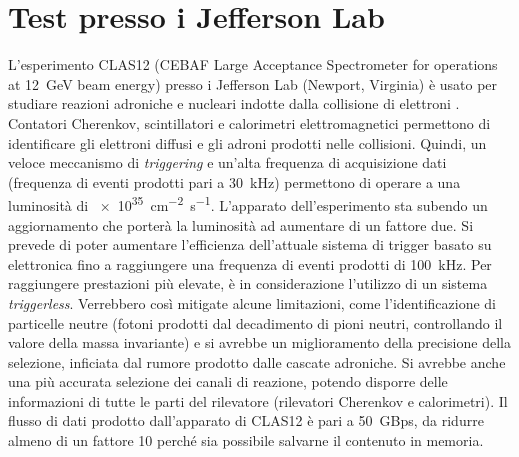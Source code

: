 \documentclass[../main.tex]{subfiles}
\begin{document}
\section{Test presso i Jefferson Lab}
\label{sct:jlab}
L'esperimento CLAS12 (CEBAF Large Acceptance Spectrometer for operations at \SI{12}{\GeV} beam energy) presso i Jefferson Lab (Newport, Virginia) è usato per studiare reazioni adroniche e nucleari indotte dalla collisione di elettroni \cite{3x3telescope}. Contatori Cherenkov, scintillatori e calorimetri elettromagnetici permettono di identificare gli elettroni diffusi e gli adroni prodotti nelle collisioni. Quindi, un veloce meccanismo di \emph{triggering} e un'alta frequenza di acquisizione dati (frequenza di eventi prodotti pari a \SI{30}{\kilo\hertz}) permettono di operare a una luminosità di \SI{e35}{\cm^{-2}\s^{-1}}.
L'apparato dell'esperimento sta subendo un aggiornamento che porterà la luminosità ad aumentare di un fattore due. Si prevede di poter aumentare l'efficienza dell'attuale sistema di trigger basato su elettronica fino a raggiungere una frequenza di eventi prodotti di \SI{100}{\kilo\hertz}. Per raggiungere prestazioni più elevate, è in considerazione l'utilizzo di un sistema \emph{triggerless}. Verrebbero così mitigate alcune limitazioni, come l'identificazione di particelle neutre (fotoni prodotti dal decadimento di pioni neutri, controllando il valore della massa invariante) e si avrebbe un miglioramento della precisione della selezione, inficiata dal rumore prodotto dalle cascate adroniche. Si avrebbe anche una più accurata selezione dei canali di reazione, potendo disporre delle informazioni di tutte le parti del rilevatore (rilevatori Cherenkov e calorimetri). Il flusso di dati prodotto dall'apparato di CLAS12 è pari a \SI{50}{GBps}, da ridurre almeno di un fattore 10 perché sia possibile salvarne il contenuto in memoria.
\end{document}
